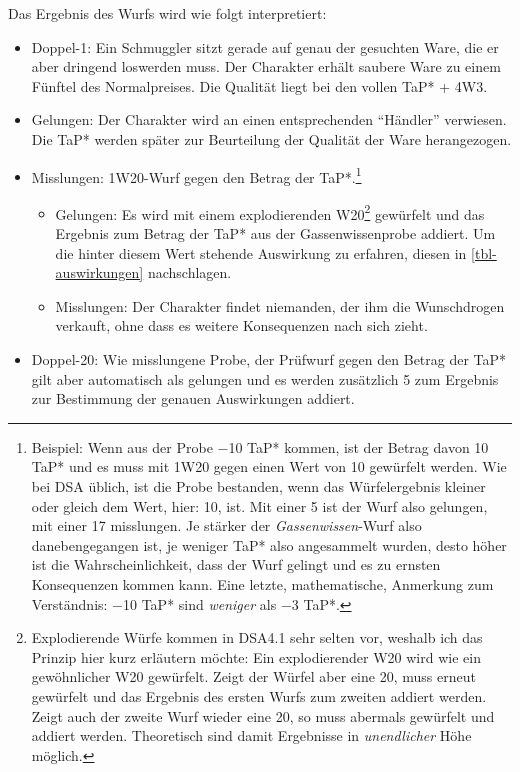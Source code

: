 Das Ergebnis des Wurfs wird wie folgt interpretiert:
\begin{itemize}
	\item Doppel-1: Ein Schmuggler sitzt gerade auf genau der gesuchten Ware, die er aber dringend loswerden muss. Der Charakter erhält saubere Ware zu einem Fünftel des Normalpreises. Die Qualität liegt bei den vollen TaP* + 4W3.
	\item Gelungen: Der Charakter wird an einen entsprechenden \enquote{Händler} verwiesen. Die TaP* werden später zur Beurteilung der Qualität der Ware herangezogen.
	\item Misslungen: 1W20-Wurf gegen den Betrag der TaP*.\footnote{Beispiel: Wenn aus der Probe −10 TaP* kommen, ist der Betrag davon 10 TaP* und es muss mit 1W20 gegen einen Wert von 10 gewürfelt werden. Wie bei DSA üblich, ist die Probe bestanden, wenn das Würfelergebnis kleiner oder gleich dem Wert, hier: 10, ist. Mit einer 5 ist der Wurf also gelungen, mit einer 17 misslungen. Je stärker der \emph{Gassenwissen}-Wurf also danebengegangen ist, je weniger TaP* also angesammelt wurden, desto höher ist die Wahrscheinlichkeit, dass der Wurf gelingt und es zu ernsten Konsequenzen kommen kann. Eine letzte, mathematische, Anmerkung zum Verständnis: −10 TaP* sind \emph{weniger} als −3 TaP*.}
		\begin{itemize}
			\item Gelungen: Es wird mit einem explodierenden W20\footnote{Explodierende Würfe kommen in DSA4.1 sehr selten vor, weshalb ich das Prinzip hier kurz erläutern möchte: Ein explodierender W20 wird wie ein gewöhnlicher W20 gewürfelt. Zeigt der Würfel aber eine 20, muss erneut gewürfelt und das Ergebnis des ersten Wurfs zum zweiten addiert werden. Zeigt auch der zweite Wurf wieder eine 20, so muss abermals gewürfelt und addiert werden. Theoretisch sind damit Ergebnisse in \emph{unendlicher} Höhe möglich.} gewürfelt und das Ergebnis zum Betrag der TaP* aus der Gassenwissenprobe addiert. Um die hinter diesem Wert stehende Auswirkung zu erfahren, diesen in \vref{tbl-auswirkungen} nachschlagen.
			\item Misslungen: Der Charakter findet niemanden, der ihm die Wunschdrogen verkauft, ohne dass es weitere Konsequenzen nach sich zieht.
		\end{itemize}
	\item Doppel-20: Wie misslungene Probe, der Prüfwurf gegen den Betrag der TaP* gilt aber automatisch als gelungen und es werden zusätzlich 5 zum Ergebnis zur Bestimmung der genauen Auswirkungen addiert.
\end{itemize}

